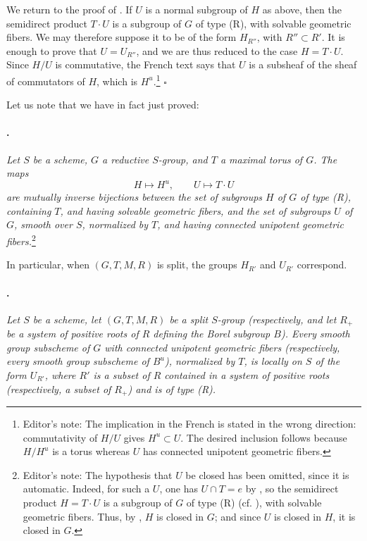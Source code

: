 We return to the proof of \textup{}. If \(U\) is a normal
subgroup of \(H\) as above, then the semidirect product \(T\cdot U\)
is a subgroup of \(G\) of type \textup{(R)}, with solvable
geometric fibers. We may therefore suppose it to be of the form
\(H_{R''}\), with \(R''\subset R'\). It is enough to prove that
\(U=U_{R''}\), and we are thus reduced to the case
\(H=T\cdot U\). Since \(H/U\) is commutative, the French text says
that \(U\) is a subsheaf of the sheaf of commutators of \(H\),
which is \(H^u\).\footnote{Editor's note: The implication in the
French is stated in the wrong direction: commutativity of \(H/U\)
gives \(H^u\subset U\). The desired inclusion follows because
\(H/H^u\) is a torus whereas \(U\) has connected unipotent
geometric fibers.}
\hfill\(\square\)

Let us note that we have in fact just proved:

\paragraph{.}
\textit{Let \(S\) be a scheme, \(G\) a reductive \(S\)-group, and
\(T\) a maximal torus of \(G\). The maps}
\[
  H\longmapsto H^u,
  \qquad
  U\longmapsto T\cdot U
\]
\textit{are mutually inverse bijections between the set of subgroups
\(H\) of \(G\) of type \textup{(R)}, containing \(T\), and having
solvable geometric fibers, and the set of subgroups \(U\) of \(G\),
smooth over \(S\), normalized by \(T\), and having connected
unipotent geometric fibers.}\footnote{Editor's note: The hypothesis
that \(U\) be closed has been omitted, since it is automatic. Indeed,
for such a \(U\), one has \(U\cap T=e\) by , so the semidirect
product \(H=T\cdot U\) is a subgroup of \(G\) of type \textup{(R)}
\textup{(cf. )}, with solvable geometric fibers. Thus, by ,
\(H\) is closed in \(G\); and since \(U\) is closed in \(H\), it is
closed in \(G\).}

In particular, when \((G,T,M,R)\) is split, the groups \(H_{R'}\)
and \(U_{R'}\) correspond.

\paragraph{.}
\textit{Let \(S\) be a scheme, let \((G,T,M,R)\) be a split
\(S\)-group \textup{(respectively, and let \(R_+\) be a system of
positive roots of \(R\) defining the Borel subgroup \(B\))}.
Every smooth group subscheme of \(G\) with connected unipotent
geometric fibers \textup{(respectively, every smooth group subscheme
of \(B^u\))}, normalized by \(T\), is locally on \(S\) of the form
\(U_{R'}\), where \(R'\) is a subset of \(R\) contained in a system
of positive roots \textup{(respectively, a subset of \(R_+\))} and
is of type \textup{(R)}.}

